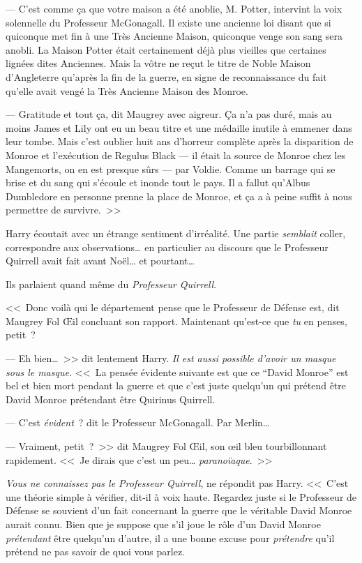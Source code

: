 --- C'est comme ça que votre maison a été anoblie, M. Potter, intervint la voix solennelle du Professeur McGonagall. Il existe une ancienne loi disant que si quiconque met fin à une Très Ancienne Maison, quiconque venge son sang sera anobli. La Maison Potter était certainement déjà plus vieilles que certaines lignées dites Anciennes. Mais la vôtre ne reçut le titre de Noble Maison d'Angleterre qu'après la fin de la guerre, en signe de reconnaissance du fait qu'elle avait vengé la Très Ancienne Maison des Monroe.

--- Gratitude et tout ça, dit Maugrey avec aigreur. Ça n'a pas duré, mais au moins James et Lily ont eu un beau titre et une médaille inutile à emmener dans leur tombe. Mais c'est oublier huit ans d'horreur complète après la disparition de Monroe et l'exécution de Regulus Black — il était la source de Monroe chez les Mangemorts, on en est presque sûrs — par Voldie. Comme un barrage qui se brise et du sang qui s'écoule et inonde tout le pays. Il a fallut qu'Albus Dumbledore en personne prenne la place de Monroe, et ça a à peine suffit à nous permettre de survivre.~>>

Harry écoutait avec un étrange sentiment d'irréalité. Une partie \emph{semblait} coller, correspondre aux observations… en particulier au discours que le Professeur Quirrell avait fait avant Noël… et pourtant…

Ils parlaient quand même du \emph{Professeur Quirrell}.

<<~Donc voilà qui le département pense que le Professeur de Défense est, dit Maugrey Fol Œil concluant son rapport. Maintenant qu'est-ce que \emph{tu} en penses, petit~?

--- Eh bien…~>> dit lentement Harry. \emph{Il est aussi possible d'avoir un masque sous le masque.} <<~La pensée évidente suivante est que ce “David Monroe” est bel et bien mort pendant la guerre et que c'est juste quelqu'un qui prétend être David Monroe prétendant être Quirinus Quirrell.

--- C'est \emph{évident}~? dit le Professeur McGonagall. Par Merlin…

--- Vraiment, petit~?~>> dit Maugrey Fol Œil, son œil bleu tourbillonnant rapidement. <<~Je dirais que c'est un peu… \emph{paranoïaque}.~>>

\emph{Vous ne connaissez pas le Professeur Quirrell}, ne répondit pas Harry. <<~C'est une théorie simple à vérifier, dit-il à voix haute. Regardez juste si le Professeur de Défense se souvient d'un fait concernant la guerre que le véritable David Monroe aurait connu. Bien que je suppose que s'il joue le rôle d'un David Monroe \emph{prétendant} être quelqu'un d'autre, il a une bonne excuse pour \emph{prétendre} qu'il prétend ne pas savoir de quoi vous parlez.

